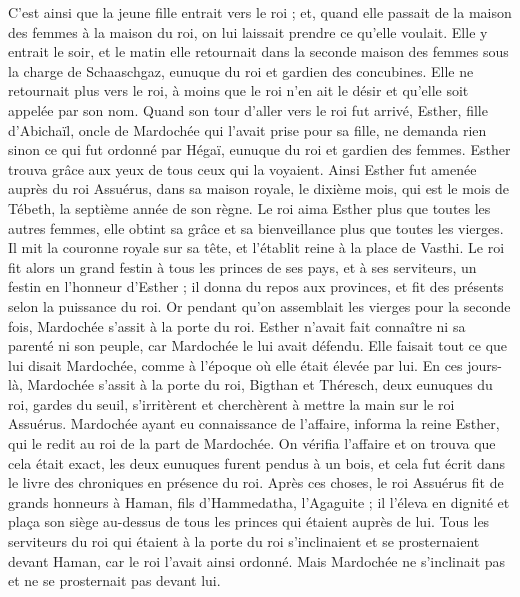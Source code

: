 \begin{multicols}{2}
C'est ainsi que la jeune fille entrait vers le roi ; et, quand elle passait de la maison des femmes à la maison du roi, on lui laissait prendre ce qu’elle voulait.
Elle y entrait le soir, et le matin elle retournait dans la seconde maison des femmes sous la charge de Schaaschgaz, eunuque du roi et gardien des concubines. Elle ne retournait plus vers le roi, à moins que le roi n’en ait le désir et qu'elle soit appelée par son nom.
Quand son tour d’aller vers le roi fut arrivé, Esther, fille d'Abichaïl, oncle de Mardochée qui l’avait prise pour sa fille, ne demanda rien sinon ce qui fut ordonné par Hégaï, eunuque du roi et gardien des femmes. Esther trouva grâce aux yeux de tous ceux qui la voyaient.
Ainsi Esther fut amenée auprès du roi Assuérus, dans sa maison royale, le dixième mois, qui est le mois de Tébeth, la septième année de son règne.
Le roi aima Esther plus que toutes les autres femmes, elle obtint sa grâce et sa bienveillance plus que toutes les vierges. Il mit la couronne royale sur sa tête, et l'établit reine à la place de Vasthi.
Le roi fit alors un grand festin à tous les princes de ses pays, et à ses serviteurs, un festin en l’honneur d'Esther ; il donna du repos aux provinces, et fit des présents selon la puissance du roi.
Or pendant qu'on assemblait les vierges pour la seconde fois, Mardochée s’assit à la porte du roi.
Esther n’avait fait connaître ni sa parenté ni son peuple, car Mardochée le lui avait défendu. Elle faisait tout ce que lui disait Mardochée, comme à l’époque où elle était élevée par lui.
En ces jours-là, Mardochée s’assit à la porte du roi, Bigthan et Théresch, deux eunuques du roi, gardes du seuil, s’irritèrent et cherchèrent à mettre la main sur le roi Assuérus.
Mardochée ayant eu connaissance de l’affaire, informa la reine Esther, qui le redit au roi de la part de Mardochée.
On vérifia l’affaire et on trouva que cela était exact, les deux eunuques furent pendus à un bois, et cela fut écrit dans le livre des chroniques en présence du roi.
\VerseOne{}Après ces choses, le roi Assuérus fit de grands honneurs à Haman, fils d'Hammedatha, l’Agaguite ; il l'éleva en dignité et plaça son siège au-dessus de tous les princes qui étaient auprès de lui.
Tous les serviteurs du roi qui étaient à la porte du roi s'inclinaient et se prosternaient devant Haman, car le roi l’avait ainsi ordonné. Mais Mardochée ne s'inclinait pas et ne se prosternait pas devant lui.

\end{multicols}
